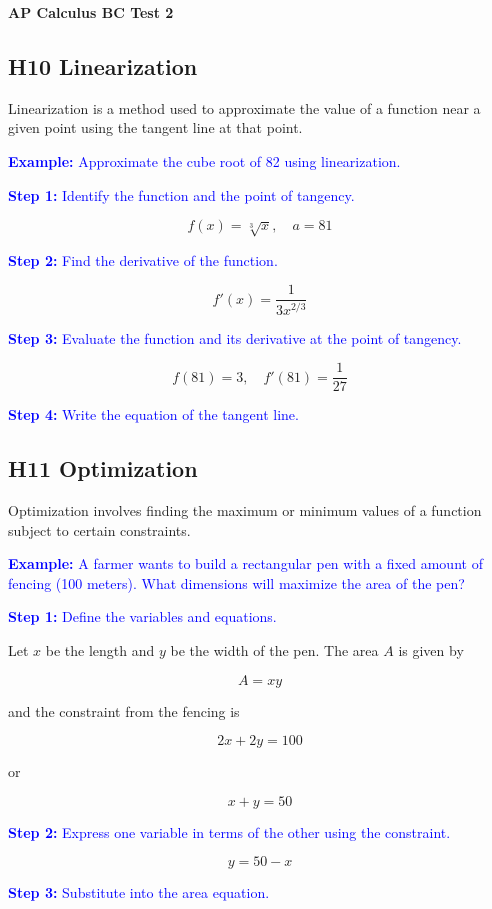 \documentclass[letterpaper, 12pt]{article}
\newcommand{\example}[1]{\textcolor{blue}{\textbf{Example:} #1}}
\newcommand{\step}[2]{\textcolor{blue}{\textbf{Step #1:} #2}}
\begin{document}
\begin{center}
\textbf{{\Large AP Calculus BC Test 2}}
\end{center}

\subsection*{H10 Linearization}

Linearization is a method used to approximate the value of a function near a given point using the tangent line at that point. 

\example{Approximate the cube root of 82 using linearization.}

\step{1}{Identify the function and the point of tangency.}

$$f(x) = \sqrt[3]{x}, \quad a = 81$$

\step{2}{Find the derivative of the function.}

$$f'(x) = \frac{1}{3x^{2/3}}$$

\step{3}{Evaluate the function and its derivative at the point of tangency.}

$$f(81) = 3, \quad f'(81) = \frac{1}{27}$$

\step{4}{Write the equation of the tangent line.}

\subsection*{H11 Optimization}

Optimization involves finding the maximum or minimum values of a function subject to certain constraints.

\example{A farmer wants to build a rectangular pen with a fixed amount of fencing (100 meters). What dimensions will maximize the area of the pen?}

\step{1}{Define the variables and equations.}

Let $x$ be the length and $y$ be the width of the pen. The area $A$ is given by

$$ A = xy $$

and the constraint from the fencing is

$$ 2x + 2y = 100 $$

or

$$ x + y = 50 $$

\step{2}{Express one variable in terms of the other using the constraint.}

$$ y = 50 - x $$

\step{3}{Substitute into the area equation.}
\end{document}
